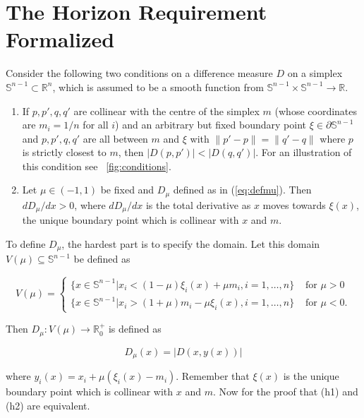 \documentclass[phd,12pt,oneside]{ubcthesis}
\begin{document}
\chapter{The Horizon Requirement Formalized}
\label{app:horform}

Consider the following two conditions on a difference measure $D$ on a
simplex $\mathbb{S}^{n-1}\subset{}\mathbb{R}^{n}$, which is assumed to
be a smooth function from
$\mathbb{S}^{n-1}\times\mathbb{S}^{n-1}\rightarrow{}\mathbb{R}$.

\begin{enumerate}[(h1)]
\item If $p,p',q,q'$ are collinear with the centre of the
  simplex $m$ (whose coordinates are $m_{i}=1/n$ for all $i$) and an
  arbitrary but fixed boundary point $\xi\in\partial\mathbb{S}^{n-1}$
  and $p,p',q,q'$ are all between $m$ and $\xi$ with
  $\|p'-p\|=\|q'-q\|$ where $p$ is strictly closest to $m$, then
  $|D(p,p')|<|D(q,q')|$. For an illustration of this condition see
  {\igure}~\ref{fig:conditions}.
\item Let $\mu\in(-1,1)$ be fixed and $D_{\mu}$ defined as in
  (\ref{eq:defmu}). Then $dD_{\mu}/dx>0$, where $dD_{\mu}/dx$ is the
  total derivative as $x$ moves towards $\xi(x)$, the unique boundary
  point which is collinear with $x$ and $m$.
\end{enumerate}

To define $D_{\mu}$, the hardest part is to specify the domain. Let
this domain $V(\mu)\subseteq{}\mathbb{S}^{n-1}$ be defined as

\begin{equation}
  \label{eq:defvmu}
  V(\mu)=\left\{\begin{array}{ll}
    \{x\in\mathbb{S}^{n-1}|x_{i}<(1-\mu)\xi_{i}(x)+\mu{}m_{i},i=1,\ldots,n\}&\mbox{ for }\mu>0 \\
    \{x\in\mathbb{S}^{n-1}|x_{i}>(1+\mu)m_{i}-\mu{}\xi_{i}(x),i=1,\ldots,n\}&\mbox{ for }\mu<0.
  \end{array}\right.
\end{equation}

{\noindent}Then $D_{\mu}:V(\mu)\rightarrow{}\mathbb{R}^{+}_{0}$ is defined as

\begin{equation}
  \label{eq:defmu}
  D_{\mu}(x)=|D(x,y(x))|
\end{equation}

{\noindent}where $y_{i}(x)=x_{i}+\mu(\xi_{i}(x)-m_{i})$. Remember that $\xi(x)$
is the unique boundary point which is collinear with $x$ and $m$.
Now for the proof that (h1) and (h2) are equivalent. 
\end{document}
